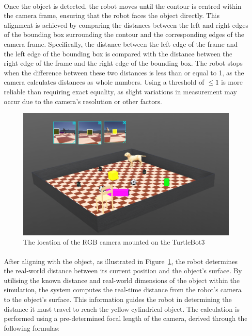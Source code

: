 \paragraph*{}
Once the object is detected, the robot moves until the contour is centred within the camera frame, ensuring that the robot faces the object directly. This alignment is achieved by comparing the distances between the left and right edges of the bounding box surrounding the contour and the corresponding edges of the camera frame. Specifically, the distance between the left edge of the frame and the left edge of the bounding box is compared with the distance between the right edge of the frame and the right edge of the bounding box. The robot stops when the difference between these two distances is less than or equal to 1, as the camera calculates distances as whole numbers. Using a threshold of \(\leq 1\) is more reliable than requiring exact equality, as slight variations in measurement may occur due to the camera's resolution or other factors.

\begin{figure}[H]
    \centering
    \includegraphics[width=0.8\linewidth]{assets/images/object_detection/fig2.png}
    \caption{The location of the RGB camera mounted on the TurtleBot3}
    \label{fig:object detection figure 2} 
\end{figure}

\paragraph*{}
After aligning with the object, as illustrated in Figure~\ref{fig:object detection figure 2}, the robot determines the real-world distance between its current position and the object's surface. By utilising the known distance and real-world dimensions of the object within the simulation, the system computes the real-time distance from the robot's camera to the object's surface. This information guides the robot in determining the distance it must travel to reach the yellow cylindrical object. The calculation is performed using a pre-determined focal length of the camera, derived through the following formulas:

